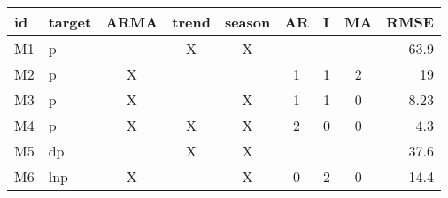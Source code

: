 \begin{tabular}{llccccccr}
\toprule
id    & target & ARMA & \multicolumn{1}{l}{trend} & \multicolumn{1}{l}{season} & \multicolumn{1}{l}{AR} & \multicolumn{1}{l}{I} & \multicolumn{1}{l}{MA} & \multicolumn{1}{l}{RMSE} \\
\midrule
M1    & p     &   & X   & X     &       &       &       & 63.9 \\
M2    & p     & X &     &       & 1     & 1     & 2     & 19 \\
M3    & p     & X &     & X     & 1     & 1     & 0     & 8.23 \\
M4    & p     & X & X   & X     & 2     & 0     & 0     & 4.3 \\
M5    & dp    &  & X   & X     &       &       &       & 37.6 \\
M6    & lnp   & X &     & X     & 0     & 2     & 0     & 14.4 \\
\bottomrule
\end{tabular}%
